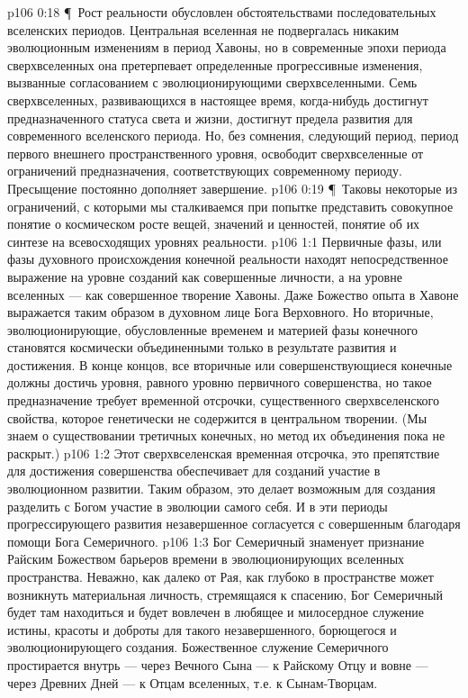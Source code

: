 \vs p106 0:18 \P\ Рост реальности обусловлен обстоятельствами последовательных вселенских периодов. Центральная вселенная не подвергалась никаким эволюционным изменениям в период Хавоны, но в современные эпохи периода сверхвселенных она претерпевает определенные прогрессивные изменения, вызванные согласованием с эволюционирующими сверхвселенными. Семь сверхвселенных, развивающихся в настоящее время, когда\hyp{}нибудь достигнут предназначенного статуса света и жизни, достигнут предела развития для современного вселенского периода. Но, без сомнения, следующий период, период первого внешнего пространственного уровня, освободит сверхвселенные от ограничений предназначения, соответствующих современному периоду. Пресыщение постоянно дополняет завершение.
\vs p106 0:19 \P\ Таковы некоторые из ограничений, с которыми мы сталкиваемся при попытке представить совокупное понятие о космическом росте вещей, значений и ценностей, понятие об их синтезе на всевосходящих уровнях реальности.
\vs p106 1:1 Первичные фазы, или фазы духовного происхождения конечной реальности находят непосредственное выражение на уровне созданий как совершенные личности, а на уровне вселенных --- как совершенное творение Хавоны. Даже Божество опыта в Хавоне выражается таким образом в духовном лице Бога Верховного. Но вторичные, эволюционирующие, обусловленные временем и материей фазы конечного становятся космически объединенными только в результате развития и достижения. В конце концов, все вторичные или совершенствующиеся конечные должны достичь уровня, равного уровню первичного совершенства, но такое предназначение требует временной отсрочки, существенного сверхвселенского свойства, которое генетически не содержится в центральном творении. (Мы знаем о существовании третичных конечных, но метод их объединения пока не раскрыт.)
\vs p106 1:2 Этот сверхвселенская временная отсрочка, это препятствие для достижения совершенства обеспечивает для созданий участие в эволюционном развитии. Таким образом, это делает возможным для создания разделить с Богом участие в эволюции самого себя. И в эти периоды прогрессирующего развития незавершенное согласуется с совершенным благодаря помощи Бога Семеричного.
\vs p106 1:3 Бог Семеричный знаменует признание Райским Божеством барьеров времени в эволюционирующих вселенных пространства. Неважно, как далеко от Рая, как глубоко в пространстве может возникнуть материальная личность, стремящаяся к спасению, Бог Семеричный будет там находиться и будет вовлечен в любящее и милосердное служение истины, красоты и доброты для такого незавершенного, борющегося и эволюционирующего создания. Божественное служение Семеричного простирается внутрь --- через Вечного Сына --- к Райскому Отцу и вовне --- через Древних Дней --- к Отцам вселенных, т.е. к Сынам\hyp{}Творцам.
